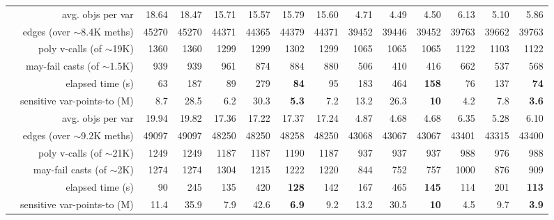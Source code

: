 \begin{table}
{\begin{tabular} {|c|r|r|r!{\vrule width 2pt}r|r|r|r!{\vrule width 2pt}r|r|r!{\vrule width 2pt}r|r|r|}
& avg. objs per var          & 18.64 & 18.47 & 15.71 & 15.57 & 15.79 & 15.60 & 4.71 & 4.49 & 4.50 & 6.13 & 5.10 & 5.86 \\
& edges (over $\sim$8.4K meths) & 45270 & 45270 & 44371 & 44365 & 44379 & 44371 & 39452 & 39446 & 39452 & 39763 & 39662 & 39763 \\
& poly v-calls (of $\sim$19K)   & 1360 & 1360 & 1299 & 1299 & 1302 & 1299 & 1065 & 1065 & 1065 & 1122 & 1103 & 1122 \\
& may-fail casts (of $\sim$1.5K)     & 939 & 939 & 961 & 874 & 884 & 880 & 506 & 410 & 416 & 662 & 537 & 568 \\
& elapsed time (s)           & 63 & 187 & 89 & 279 & {\bf 84} & 95 & 183 & 464 & {\bf 158} & 76 & 137 & {\bf 74} \\
& sensitive var-points-to (M)    & 8.7 & 28.5 & 6.2 & 30.3 & {\bf 5.3} & 7.2 & 13.2 & 26.3 & {\bf 10} & 4.2 & 7.8 & {\bf 3.6} \\

& avg. objs per var          & 19.94 & 19.82 & 17.36 & 17.22 & 17.37 & 17.24 & 4.87 & 4.68 & 4.68 & 6.35 & 5.28 & 6.10 \\
& edges (over $\sim$9.2K meths) & 49097 & 49097 & 48250 & 48250 & 48258 & 48250 & 43068 & 43067 & 43067 & 43401 & 43315 & 43400 \\
& poly v-calls (of $\sim$21K)   & 1249 & 1249 & 1187 & 1187 & 1190 & 1187 & 937 & 937 & 937 & 988 & 976 & 988 \\
& may-fail casts (of $\sim$2K)     & 1274 & 1274 & 1304 & 1215 & 1222 & 1220 & 844 & 752 & 757 & 1000 & 876 & 909 \\
& elapsed time (s)           & 90 & 245 & 135 & 420 & {\bf 128} & 142 & 167 & 465 & {\bf 145} & 114 & 201 & {\bf 113} \\
& sensitive var-points-to (M)    & 11.4 & 35.9 & 7.9 & 42.6 & {\bf 6.9} & 9.2 & 13.2 & 30.5 & {\bf 10} & 4.5 & 9.7 & {\bf 3.9} \\


\end{tabular}}
\end{table}
